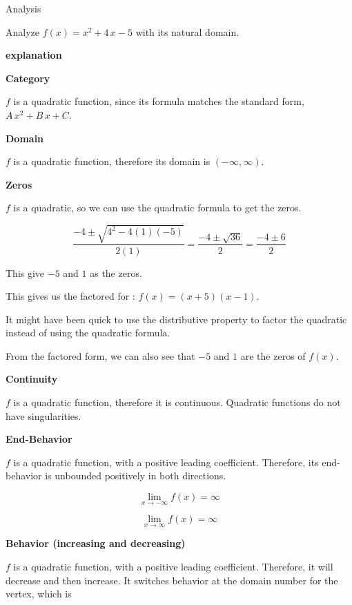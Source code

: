 \documentclass{ximera}
\begin{document}
\begin{example} Analysis


Analyze $f(x) = x^2 + 4 \, x - 5$ with its natural domain.    




\textbf{\textcolor{red!75!green}{explanation}} 





\textbf{Category}


$f$ is a quadratic function, since its formula matches the standard form, $A \, x^2 + B \, x + C$. 






\textbf{Domain}

$f$ is a quadratic function, therefore its domain is $(-\infty, \infty)$. 



\textbf{Zeros}


$f$ is a quadratic, so we can use the quadratic formula to get the zeros.

\[
\frac{-4 \pm \sqrt{4^2 - 4(1)(-5)}}{2(1)} = \frac{-4 \pm \sqrt{36}}{2} = \frac{-4 \pm 6}{2}
\]

This give $-5$ and $1$ as the zeros.

This gives us the factored for : $f(x) = (x+5)(x-1)$.


It might have been quick to use the distributive property to factor the quadratic instead of using the quadratic formula. 

From the factored form, we can also see that $-5$ and $1$ are the zeros of $f(x)$.  


\textbf{Continuity}

$f$ is a quadratic function, therefore it is continuous. Quadratic functions do not have singularities.



\textbf{End-Behavior}

$f$ is a quadratic function, with a positive leading coefficient. Therefore, its end-behavior is unbounded positively in both directions. 

\[
\lim\limits_{x \to -\infty} f(x) = \infty 
\]


\[
\lim\limits_{x \to \infty} f(x) = \infty 
\]




\textbf{Behavior (increasing and decreasing)}

$f$ is a quadratic function, with a positive leading coefficient. Therefore, it will decrease and then increase. It switches behavior at the domain number for the vertex, which is



\end{example}
\end{document}
